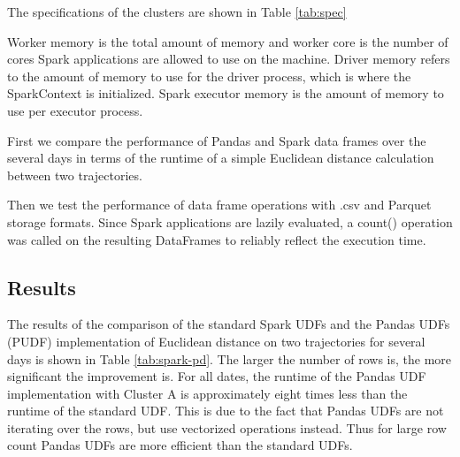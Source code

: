 The specifications of the clusters are shown in Table \ref{tab:spec}
\begin{table}[h]
    \centering
    \caption{Specifications of test clusters}
    \label{tab:spec}
\end{table}

Worker memory is the total amount of memory and worker core is the number of cores Spark applications are allowed to use on the machine. Driver memory refers to the amount of memory to use for the driver process, which is where the SparkContext is initialized. Spark executor memory is the amount of memory to use per executor process. \cite{spark:rdds}

First we compare the performance of Pandas and Spark data frames over the several days in terms of the runtime of a simple Euclidean distance calculation between two trajectories.

Then we test the performance of data frame operations with .csv and Parquet storage formats. Since Spark applications are lazily evaluated, a count() operation was called on the resulting DataFrames to reliably reflect the execution time.

\subsection{Results}
The results of the comparison of the standard Spark UDFs and the Pandas UDFs (PUDF) implementation of Euclidean distance on two trajectories for several days is shown in Table \ref{tab:spark-pd}. The larger the number of rows is, the more significant the improvement is. For all dates, the runtime of the Pandas UDF implementation with Cluster A is approximately eight times less than the runtime of the standard UDF. This is due to the fact that Pandas UDFs are not iterating over the rows, but use vectorized operations instead. Thus for large row count Pandas UDFs are more efficient than the standard UDFs. 

